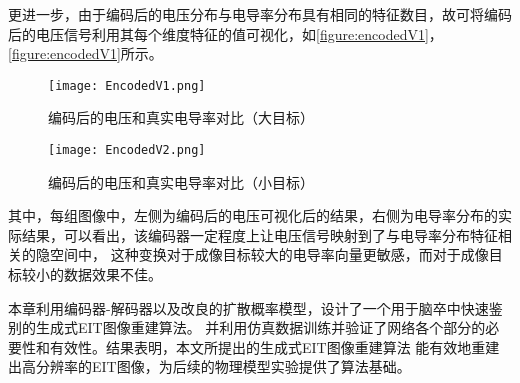 更进一步，由于编码后的电压分布与电导率分布具有相同的特征数目，故可将编码后的电压信号利用其每个维度特征的值可视化，如\cref{figure:encodedV1}，\cref{figure:encodedV1}所示。

\begin{figure}[h]
    \centering
    \texttt{[image: EncodedV1.png]}
    \caption{编码后的电压和真实电导率对比（大目标）}
    \label{figure:EncodedV1}
\end{figure}

\begin{figure}[h]
    \centering
    \texttt{[image: EncodedV2.png]}
    \caption{编码后的电压和真实电导率对比（小目标）}
    \label{figure:EncodedV2}
\end{figure}

其中，每组图像中，左侧为编码后的电压可视化后的结果，右侧为电导率分布的实际结果，可以看出，该编码器一定程度上让电压信号映射到了与电导率分布特征相关的隐空间中，
这种变换对于成像目标较大的电导率向量更敏感，而对于成像目标较小的数据效果不佳。



本章利用编码器-解码器以及改良的扩散概率模型，设计了一个用于脑卒中快速鉴别的生成式EIT图像重建算法。
并利用仿真数据训练并验证了网络各个部分的必要性和有效性。结果表明，本文所提出的生成式EIT图像重建算法
能有效地重建出高分辨率的EIT图像，为后续的物理模型实验提供了算法基础。
